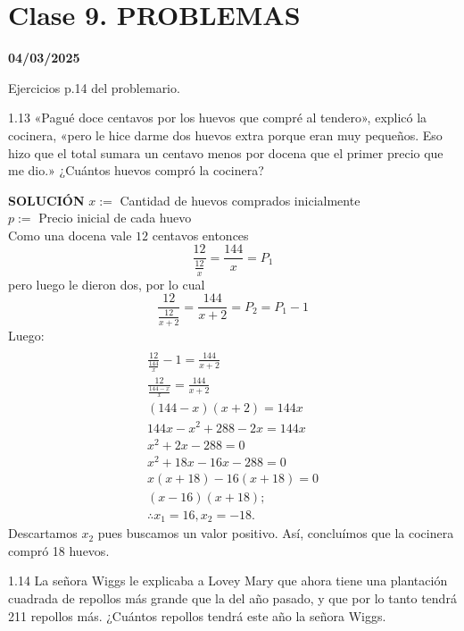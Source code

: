 \section{Clase 9. PROBLEMAS}
\textbf{04/03/2025}

Ejercicios p.14 del problemario.
\begin{excercise}
    1.13 «Pagué doce centavos por los huevos que compré al tendero», explicó la cocinera, «pero le hice darme dos huevos extra porque eran muy pequeños. Eso hizo que el total sumara un centavo menos por docena que el primer precio que me dio.» ¿Cuántos huevos compró la cocinera?
\end{excercise}

\textbf{SOLUCIÓN}
    $x :=$ Cantidad de huevos comprados inicialmente\\
    $p :=$ Precio inicial de cada huevo\\
    Como una docena vale $12$ centavos entonces
    \[ \frac{12}{\frac{12}{x}} = \frac{144}{x} = P_1 \]
    pero luego le dieron dos, por lo cual
    \[ \frac{12}{\frac{12}{x+2}} = \frac{144}{x+2} = P_2 = P_1 -1 \]
    Luego:\\
    \begin{gather*}
        \\ \frac{12}{\frac{144}{x}}-1 = \frac{144}{x+2}
        \\ \frac{12}{\frac{144-x}{x}} = \frac{144}{x+2}
        \\ (144-x)(x+2) = 144x
        \\ 144x -x^{2} + 288 -2x = 144x
        \\ x^{2}+2x-288 = 0
        \\ x^{2} + 18x -16x - 288 = 0
        \\ x(x+18) -16(x+18) = 0
        \\ (x-16)(x+18); 
        \\ \therefore x_1 = 16, x_2 = -18.
    \end{gather*}
    Descartamos $x_2$ pues buscamos un valor positivo. Así, concluímos que la cocinera compró 18 huevos.

\begin{excercise}
    1.14 La señora Wiggs le explicaba a Lovey Mary que ahora tiene una plantación cuadrada de repollos más grande que la del año pasado, y que por lo tanto tendrá 211 repollos más. ¿Cuántos repollos tendrá este año la señora Wiggs.
\end{excercise}

